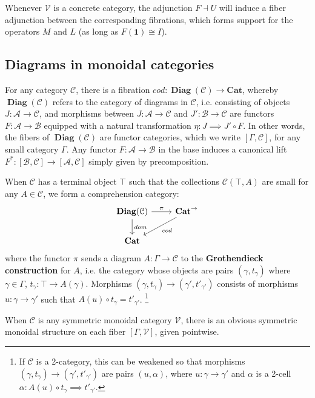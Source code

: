 \documentclass[a4paper,english]{lipics-v2018}
\DeclareMathOperator{\diag}{\mathbf{Diag}}
\begin{document}
Whenever $\mathcal{V}$ is a concrete category, the adjunction $F \dashv U$ will induce a fiber adjunction between the corresponding fibrations, which forms support for the operators $M$ and $L$ (as long as $F(\mathbf{1}) \cong I$).
\subsection{Diagrams in monoidal categories}
For any category $\mathcal{C}$, there is a fibration $cod : \diag(\mathcal{C}) \to \mathbf{Cat}$, whereby $\diag(\mathcal{C})$ refers to the category of diagrams in $\mathcal{C}$, i.e. consisting of objects $J : \mathcal{A} \to \mathcal{C}$, and morphisms between $J : \mathcal{A} \to \mathcal{C}$ and $J' :\mathcal{B} \to \mathcal{C}$ are functors $F : \mathcal{A} \to \mathcal{B}$ equipped with a natural transformation $\eta: J \implies J' \circ F$. In other words, the fibers of $\diag(\mathcal{C})$ are functor categories, which we write $[\Gamma, \mathcal{C}]$, for any small category $\Gamma$. Any functor $F : \mathcal{A} \to \mathcal{B}$ in the base induces a canonical lift $F^* : [\mathcal{B}, \mathcal{C}] \to [\mathcal{A},\mathcal{C}]$ simply given by precomposition.

When $\mathcal{C}$ has a terminal object $\top$ such that the collections $\mathcal{C}(\top, A)$ are small for any $A \in \mathcal{C}$, we form a comprehension category:
\[
\begin{tikzcd}
\diag(\mathcal{C}) \ar[d, "dom"] \ar[r,"\pi"] & \mathbf{Cat}^\to \ar[ld, "cod"] \\
\mathbf{Cat}
\end{tikzcd}
\]
where the functor $\pi$ sends a diagram $A : \Gamma \to \mathcal{C}$ to the \textbf{Grothendieck construction} for $A$, i.e. the category whose objects are pairs $(\gamma, t_\gamma)$ where $\gamma \in \Gamma$, $t_\gamma : \top \to A(\gamma)$. Morphisms $(\gamma, t_\gamma) \to (\gamma', t'_{\gamma'})$ consists of morphisms $u : \gamma \to \gamma'$ such that $ A(u) \circ t_\gamma = t'_{\gamma'}$. \footnote{If $\mathcal{C}$ is a 2-category, this can be weakened so that morphisms $(\gamma, t_\gamma) \to (\gamma', t'_{\gamma'})$ are pairs $(u, \alpha)$, where $u : \gamma \to \gamma'$ and $\alpha$ is a 2-cell $\alpha : A(u) \circ t_\gamma \implies t'_{\gamma'}$.}

When $\mathcal{C}$ is any symmetric monoidal category $\mathcal{V}$, there is an obvious symmetric monoidal structure on each fiber $[\Gamma, \mathcal{V}]$, given pointwise.
\end{document}
